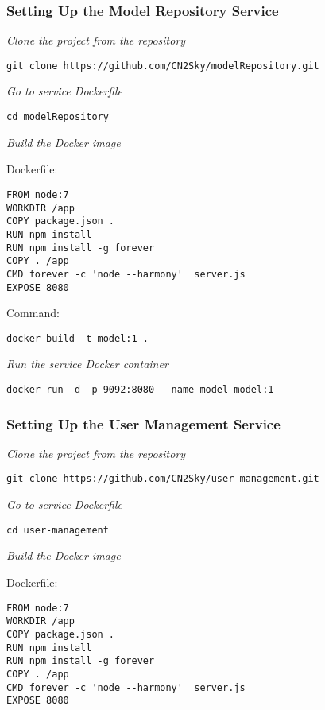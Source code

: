 \subsubsection{Setting Up the Model Repository Service}\label{model setup}

\emph{Clone the project from the repository}
 \begin{lstlisting}
git clone https://github.com/CN2Sky/modelRepository.git
\end{lstlisting}

\emph{Go to service Dockerfile}
 \begin{lstlisting}
cd modelRepository
\end{lstlisting}

\emph{Build the Docker image}

Dockerfile:
 \begin{lstlisting}
FROM node:7
WORKDIR /app
COPY package.json .
RUN npm install
RUN npm install -g forever
COPY . /app
CMD forever -c 'node --harmony'  server.js
EXPOSE 8080
\end{lstlisting}

Command: 

 \begin{lstlisting}
docker build -t model:1 .
\end{lstlisting}


\emph{Run the service Docker container}
 \begin{lstlisting}
docker run -d -p 9092:8080 --name model model:1
\end{lstlisting}



\subsubsection{Setting Up the User Management Service}\label{user setup}

\emph{Clone the project from the repository}
 \begin{lstlisting}
git clone https://github.com/CN2Sky/user-management.git
\end{lstlisting}

\emph{Go to service Dockerfile}
 \begin{lstlisting}
cd user-management
\end{lstlisting}

\emph{Build the Docker image}

Dockerfile:
 \begin{lstlisting}
FROM node:7
WORKDIR /app
COPY package.json .
RUN npm install
RUN npm install -g forever
COPY . /app
CMD forever -c 'node --harmony'  server.js
EXPOSE 8080
\end{lstlisting}

